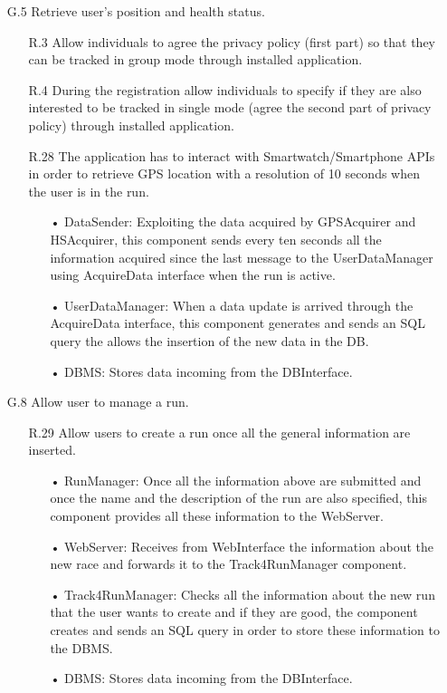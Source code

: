 \begin{enumerate}
\item [G.5] Retrieve user's position and health status.
	\begin{enumerate}
	\item [R.3] Allow individuals to agree the privacy policy (first part) so that they can be tracked in group mode through installed application.  
	\item [R.4] During the registration allow individuals to specify if they are also interested to be tracked in single mode (agree the second part of privacy policy) through installed application. 
	\item [R.28] The application has to interact with Smartwatch/Smartphone APIs in order to retrieve GPS location with a resolution of 10 seconds when the user is in the run.
		\begin{enumerate}
		\item[•] DataSender: Exploiting the data acquired by GPSAcquirer and HSAcquirer, this component sends every ten seconds all the information acquired since the last message to the UserDataManager using AcquireData interface when the run is active.
		\item[•] UserDataManager: When a data update is arrived through the AcquireData interface, this component generates and sends an SQL query the allows the insertion of the new data in the DB.
		\item[•] DBMS: Stores data incoming from the DBInterface.
		\end{enumerate}	
	\end{enumerate}
	
\item [G.8] Allow user to manage a run.
	\begin{enumerate}
	\item [R.29] Allow users to create a run once all the general information are inserted.
		\begin{enumerate}
		\item[•] RunManager: Once all the information above are submitted and once the name and the description of the run are also specified, this component provides all these information to the WebServer.
		\item[•] WebServer: Receives from WebInterface the information about the new race and forwards it to the Track4RunManager component.
		\item[•] Track4RunManager: Checks all the information about the new run that the user wants to create and if they are good, the component creates and sends an SQL query in order to store these information to the DBMS.
		\item[•] DBMS: Stores data incoming from the DBInterface.
		\end{enumerate}	
		

\end{enumerate}
\end{enumerate}
